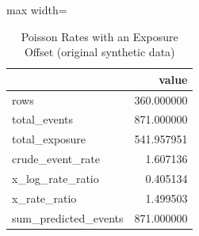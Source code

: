 \begin{table}[htbp]
\centering
\caption{Poisson Rates with an Exposure Offset (original synthetic data)}
\begingroup
\small
\setlength{\tabcolsep}{6pt}
\renewcommand{\arraystretch}{1.12}
\begin{adjustbox}{max width=\linewidth}
\begin{tabular}{@{}lr@{}}
\toprule
 & value \\
\midrule
rows & 360.000000 \\
total\_events & 871.000000 \\
total\_exposure & 541.957951 \\
crude\_event\_rate & 1.607136 \\
x\_log\_rate\_ratio & 0.405134 \\
x\_rate\_ratio & 1.499503 \\
sum\_predicted\_events & 871.000000 \\
\bottomrule
\end{tabular}
\end{adjustbox}
\endgroup
\end{table}
